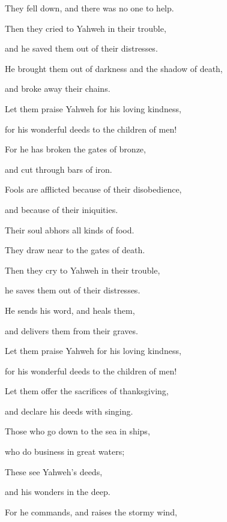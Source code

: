{\par }{\QB They fell down, and there was no one to help.
\par }{\Q {}Then they cried to Yahweh in their trouble,
\par }{\QB and he saved them out of their distresses.
\par }{\Q {}He brought them out of darkness and the shadow of death,
\par }{\QB and broke away their chains.
\par }{\Q {}Let them praise Yahweh for his loving kindness,
\par }{\QB for his wonderful deeds to the children of men!
\par }{\BB \par }{\Q {}For he has broken the gates of bronze,
\par }{\QB and cut through bars of iron.
\par }{\BB \par }{\Q {}Fools are afflicted because of their disobedience,
\par }{\QB and because of their iniquities.
\par }{\Q {}Their soul abhors all kinds of food.
\par }{\QB They draw near to the gates of death.
\par }{\Q {}Then they cry to Yahweh in their trouble,
\par }{\QB he saves them out of their distresses.
\par }{\Q {}He sends his word, and heals them,
\par }{\QB and delivers them from their graves.
\par }{\Q {}Let them praise Yahweh for his loving kindness,
\par }{\QB for his wonderful deeds to the children of men!
\par }{\BB \par }{\Q {}Let them offer the sacrifices of thanksgiving,
\par }{\QB and declare his deeds with singing.
\par }{\BB \par }{\Q {}Those who go down to the sea in ships,
\par }{\QB who do business in great waters;
\par }{\QB {}These see Yahweh’s deeds,
\par }{\QB and his wonders in the deep.
\par }{\Q {}For he commands, and raises the stormy wind,
}

